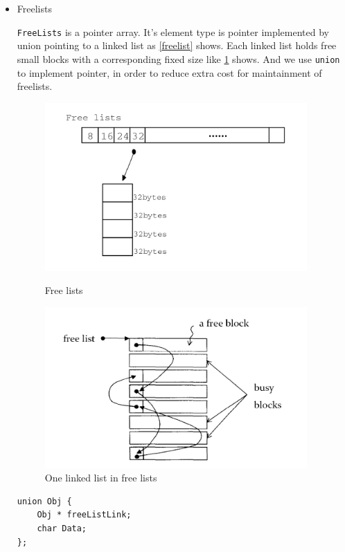 \documentclass{article}
\begin{document}
\begin{itemize}
	\item{Freelists}
	
	\texttt{FreeLists} is a pointer array. It's element type is pointer implemented by union  pointing to a linked list as \ref{freelist} shows. Each linked list holds free small blocks with a corresponding fixed size like \ref{linkedlist} shows. And we use \texttt{union} to implement pointer, in order to reduce extra cost for maintainment of freelists. 
	\begin{figure}
		\centering
		\includegraphics[width=10cm]{freelists.png}
		\caption{Free lists\label{freelist}}
		\includegraphics[width=10cm]{freelist.png}
		\caption{One linked list in free lists\label{linkedlist}}
	\end{figure}
\begin{lstlisting}
union Obj {
	Obj * freeListLink;
	char Data;
};
\end{lstlisting}
	
\end{itemize}
\end{document}
